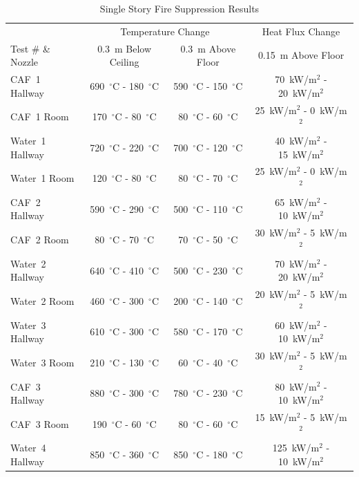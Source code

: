 \documentclass[12pt,oneside]{book}
\begin{document}
\begin{table}[!ht]
\centering
\caption{Single Story Fire Suppression Results}\label{tab:Test_Results}
\begin{tabular}{lccc}
\toprule[1.5pt]
                 & \multicolumn{2}{c}{Temperature Change}                                    & Heat Flux Change \\
Test \# \& Nozzle	         & 0.3~m Below Ceiling                 & 0.3~m  Above Floor	                 & 0.15~m Above Floor \\
\midrule
CAF~1 Hallway    & 690~$^{\circ}$C - 180~$^{\circ}$C   & 590~$^{\circ}$C - 150~$^{\circ}$C   & 70~kW/m$^2$ - 20~kW/m$^2$  \\
CAF~1 Room       & 170~$^{\circ}$C - 80~$^{\circ}$C    & 80~$^{\circ}$C - 60~$^{\circ}$C     & 25~kW/m$^2$ - 0~kW/m$^2$  \\ [.25cm]
Water~1 Hallway  & 720~$^{\circ}$C - 220~$^{\circ}$C   & 700~$^{\circ}$C - 120~$^{\circ}$C   & 40~kW/m$^2$ - 15~kW/m$^2$  \\
Water~1 Room     & 120~$^{\circ}$C - 80~$^{\circ}$C    & 80~$^{\circ}$C - 70~$^{\circ}$C     & 25~kW/m$^2$ - 0~kW/m$^2$  \\ [.25cm]
CAF~2 Hallway    & 590~$^{\circ}$C - 290~$^{\circ}$C   & 500~$^{\circ}$C - 110~$^{\circ}$C   & 65~kW/m$^2$ - 10~kW/m$^2$  \\
CAF~2 Room       & 80~$^{\circ}$C -  70~$^{\circ}$C    & 70~$^{\circ}$C - 50~$^{\circ}$C     & 30~kW/m$^2$ - 5~kW/m$^2$  \\ [.25cm]
Water~2 Hallway  & 640~$^{\circ}$C - 410~$^{\circ}$C   & 500~$^{\circ}$C - 230~$^{\circ}$C   & 70~kW/m$^2$ - 20~kW/m$^2$  \\
Water~2 Room     & 460~$^{\circ}$C - 300~$^{\circ}$C   & 200~$^{\circ}$C - 140~$^{\circ}$C   & 20~kW/m$^2$ - 5~kW/m$^2$  \\ [.25cm]
Water~3 Hallway  & 610~$^{\circ}$C - 300~$^{\circ}$C   & 580~$^{\circ}$C - 170~$^{\circ}$C   & 60~kW/m$^2$ - 10~kW/m$^2$  \\
Water~3 Room     & 210~$^{\circ}$C - 130~$^{\circ}$C   & 60~$^{\circ}$C - 40~$^{\circ}$C     & 30~kW/m$^2$ - 5~kW/m$^2$  \\ [.25cm]
CAF~3 Hallway    & 880~$^{\circ}$C - 300~$^{\circ}$C   & 780~$^{\circ}$C - 230~$^{\circ}$C   & 80~kW/m$^2$ - 10~kW/m$^2$  \\
CAF~3 Room       & 190~$^{\circ}$C - 60~$^{\circ}$C    & 80~$^{\circ}$C - 60~$^{\circ}$C     & 15~kW/m$^2$ - 5~kW/m$^2$  \\ [.25cm]
Water~4 Hallway  & 850~$^{\circ}$C - 360~$^{\circ}$C   & 850~$^{\circ}$C - 180~$^{\circ}$C   & 125~kW/m$^2$ - 10~kW/m$^2$  \\

\end{tabular}
\end{table}
\end{document}
